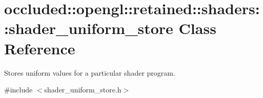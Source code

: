 \hypertarget{classoccluded_1_1opengl_1_1retained_1_1shaders_1_1shader__uniform__store}{\section{occluded\+:\+:opengl\+:\+:retained\+:\+:shaders\+:\+:shader\+\_\+uniform\+\_\+store Class Reference}
\label{classoccluded_1_1opengl_1_1retained_1_1shaders_1_1shader__uniform__store}
}


Stores uniform values for a particular shader program.  




{\ttfamily \#include $<$shader\+\_\+uniform\+\_\+store.\+h$>$}

